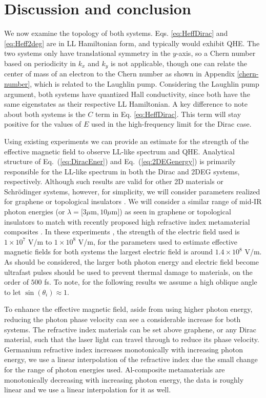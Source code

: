 \section{Discussion and conclusion}

We now examine the topology of both systems.
Eqs. \eqref{eq:HeffDirac} and \eqref{eq:Heff2deg} are in LL Hamiltonian form, and typically would exhibit QHE.
The two systems only have translational symmetry in the $y$-axis, so a Chern number based on periodicity in $k_x$ and $k_y$ is not applicable, though one can relate the center of mass of an electron to the Chern number as shown in Appendix \ref{chern-number}, which is related to the Laughlin pump.
Considering the Laughlin pump argument, both systems have quantized Hall conductivity, since both have the same eigenstates as their respective LL Hamiltonian.
A key difference to note about both systems is the $C$ term in Eq. \eqref{eq:HeffDirac}.
This term will stay positive for the values of $E$ used in the high-frequency limit for the Dirac case.

Using existing experiments \cite{YHW, JWM} we can provide an estimate for the strength of the effective magnetic field to observe LL-like spectrum and QHE.
Analytical structure of Eq.~(\ref{eq:DiracEner}) and Eq.~(\ref{eq:2DEGenergy}) is primarily responsible for the LL-like spectrum in both the Dirac and 2DEG systems, respectively.
Although such results are valid for other 2D materials or Schr\"{o}dinger systems, however, for simplicity, we will consider parameters realized for graphene or topological insulators \cite{YHW, JWM}.
We will consider a similar range of mid-IR photon energies (or $\lambda = [3\mu $m$ , 10\mu $m$]$) as seen in graphene or topological insulators \cite{YHW, JWM} to match with recently proposed high refractive index metamaterial composites \cite{shimFundamentalLimitsRefractive2021}.
In these experiments \cite{YHW, JWM}, the strength of the electric field used is $1 \times 10^7$ V/m to $1 \times 10^8$ V/m, for the parameters used to estimate effective magnetic fields for both systems the largest electric field is around $1.4 \times 10^8$ V/m.
As should be considered, the larger both photon energy and electric field become ultrafast pulses should be used to prevent thermal damage to materials, on the order of $500$ fs.
To note, for the following results we assume a high oblique angle to let $\sin{(\theta_i)} \approx 1$.

To enhance the effective magnetic field, aside from using higher photon energy, reducing the photon phase velocity can see a considerable increase for both systems.
The refractive index materials can be set above graphene, or any Dirac material, such that the laser light can travel through to reduce its phase velocity.
Germanium refractive index increases monotonically with increasing photon energy, we use a linear interpolation of the refractive index due the small change for the range of photon energies used.
Al-composite metamaterials are monotonically decreasing with increasing photon energy, the data is roughly linear and we use a linear interpolation for it as well.

